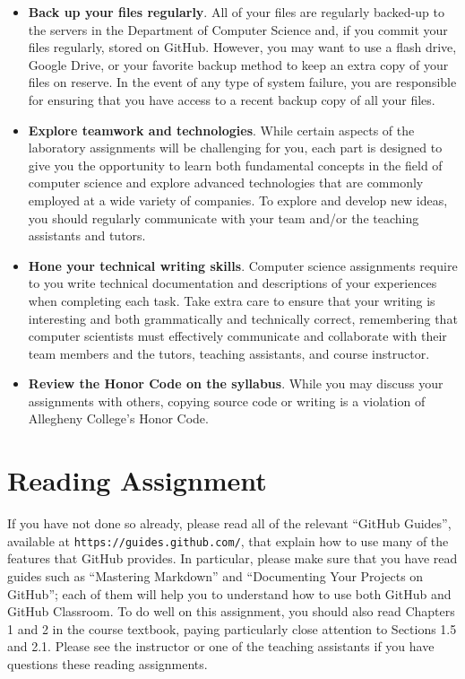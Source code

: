 \documentclass[11pt]{article}
\newcommand{\url}[1]{\lstinline{#1}}
\begin{document}
\begin{itemize}
\item {\bf Back up your files regularly}. All of your files are regularly
  backed-up to the servers in the Department of Computer Science and, if you
  commit your files regularly, stored on GitHub. However, you may want to use a
  flash drive, Google Drive, or your favorite backup method to keep an extra
  copy of your files on reserve. In the event of any type of system failure,
  you are responsible for ensuring that you have access to a recent backup copy
  of all your files.

\item {\bf Explore teamwork and technologies}. While certain aspects of the
  laboratory assignments will be challenging for you, each part is designed to
  give you the opportunity to learn both fundamental concepts in the field of
  computer science and explore advanced technologies that are commonly employed
  at a wide variety of companies. To explore and develop new ideas, you should
  regularly communicate with your team and/or the teaching assistants and
  tutors.

\item {\bf Hone your technical writing skills}. Computer science assignments
  require to you write technical documentation and descriptions of your
  experiences when completing each task. Take extra care to ensure that your
  writing is interesting and both grammatically and technically correct,
  remembering that computer scientists must effectively communicate and
  collaborate with their team members and the tutors, teaching assistants, and
  course instructor.

\item {\bf Review the Honor Code on the syllabus}. While you may discuss your
  assignments with others, copying source code or writing is a violation of
  Allegheny College's Honor Code.

\end{itemize}

\section*{Reading Assignment}

If you have not done so already, please read all of the relevant ``GitHub
Guides'', available at \url{https://guides.github.com/}, that explain how to
use many of the features that GitHub provides. In particular, please make sure
that you have read guides such as ``Mastering Markdown'' and ``Documenting Your
Projects on GitHub''; each of them will help you to understand how to use both
GitHub and GitHub Classroom. To do well on this assignment, you should also
read Chapters 1 and 2 in the course textbook, paying particularly close
attention to Sections 1.5 and 2.1. Please see the instructor or one of the
teaching assistants if you have questions these reading assignments.
\end{document}
